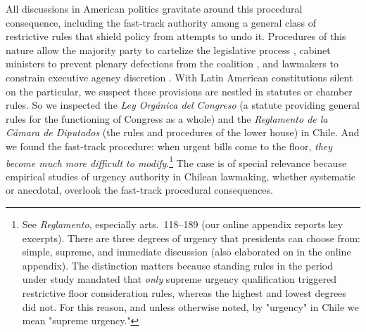 \documentclass[letter,12pt]{article}
\begin{document}
All discussions in American politics gravitate around this procedural consequence, including the fast-track authority among a general class of restrictive rules that shield policy from attempts to undo it. Procedures of this nature allow the majority party to cartelize the legislative process \citep{cox.mccubbins.1993}, cabinet ministers to prevent plenary defections from the coalition \citep{heller.2001}, and lawmakers to constrain executive agency discretion \citep{mcnollgast.1987}. With Latin American constitutions silent on the particular, we suspect these provisions are nestled in statutes or chamber rules. So we inspected the \emph{Ley Orgánica del Congreso} (a statute providing general rules for the functioning of Congress as a whole) and the \emph{Reglamento de la Cámara de Diputados} (the rules and procedures of the lower house) in Chile. And we found the fast-track procedure: when urgent bills come to the floor, \emph{they become much more difficult to modify}.\footnote{See \emph{Reglamento}, especially arts.\ 118--189 (our online appendix reports key excerpts). There are three degrees of urgency that presidents can choose from: simple, supreme, and immediate discussion (also elaborated on in the online appendix). The distinction matters because standing rules in the period under study mandated that \emph{only} supreme urgency qualification triggered restrictive floor consideration rules, whereas the highest and lowest degrees did not. For this reason, and unless otherwise noted, by "urgency" in Chile we mean "supreme urgency."}\label{fn:supreme} The case is of special relevance because empirical studies of urgency authority in Chilean lawmaking, whether systematic or anecdotal, overlook the fast-track procedural consequences.
\end{document}
